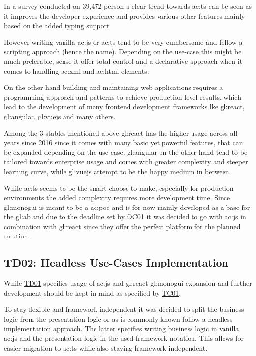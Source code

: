 
In a survey conducted on 39,472 person a clear trend towards \gls{ac:ts} can be seen as it improves the developer experience and provides various other features mainly based on the added typing support \citep{TheStateOfJs}

However writing vanilla \gls{ac:js} or \gls{ac:ts} tend to be very cumbersome and follow a scripting approach (hence the name). Depending on the use-case this might be much preferable, sense it offer total control and a declarative approach when it comes to handling \gls{ac:xml} and \gls{ac:html} elements. 

On the other hand building and maintaining web applications requires a programming approach and patterns to achieve production level results, which lead to the development of many frontend development frameworks lke \gls{gl:react}, \gls{gl:angular}, \gls{gl:vuejs} and many others.

Among the 3 stables mentioned above \gls{gl:react} has the higher usage across all years since 2016 \citep{TheStateOfJs} since it comes with many basic yet powerful features, that can be expanded depending on the use-case. \gls{gl:angular} on the other hand tend to be tailored towards enterprise usage and comes with greater complexity and steeper learning curve, while \gls{gl:vuejs} attempt to be the happy medium in between.


While \gls{ac:ts} seems to be the smart choose to make, especially for production environments the added complexity requires more development time. Since \gls{gl:monogui} is meant to be a \gls{ac:poc} and is for now mainly developed as a base for the \gls{gl:ab} and due to the deadline set by \hyperref[tab:aboc]{OC01} it was decided to go with \gls{ac:js} in combination with \gls{gl:react} since they offer the perfect platform for the planned solution.

\subsection{TD02: Headless Use-Cases Implementation}

While \hyperref[abtd:01]{TD01} specifies usage of \gls{ac:js} and \gls{gl:react} \gls{gl:monogui} expansion and further development should be kept in mind as specified by \hyperref[tab:abtc]{TC01}. 

To stay flexible and framework independent it was decided to split the business logic from the presentation logic or as is commonly known follow a headless implementation approach. The latter specifies writing business logic in vanilla \gls{ac:js} and the presentation logic in the used framework notation. This allows for easier migration to \gls{ac:ts} while also staying framework independent. 